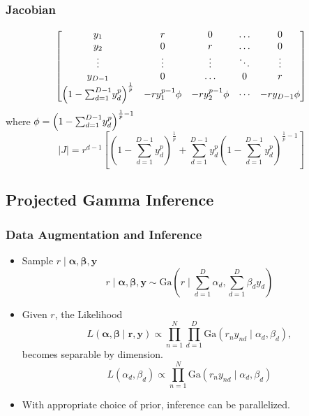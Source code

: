 \documentclass[aspectratio=169,10pt,notes]{beamer}
\begin{document}
\begin{frame}
  \frametitle{Jacobian}
  \label{pgpareto:jacobian}
  \begin{equation*}
    \begin{bmatrix}
      y_1 & r & 0 & \ldots & 0\\
      y_2 & 0 & r & \ldots & 0\\
      \vdots & \vdots & \vdots & \ddots & \vdots\\
      y_{D-1} & 0 & \ldots & 0 & r \\
      \left(1 - {\scriptsize\sum_{d=1}^{D-1}}y_d^p\right)^{\frac{1}{p}} &
        - ry_1^{p-1}\phi & -ry_2^{p-1}\phi & \cdots & -ry_{D-1}\phi
    \end{bmatrix}
  \end{equation*}
  where $\phi = \left(1 - {\scriptsize\sum_{d=1}^{D-1}}y_d^p\right)^{\frac{1}{p} - 1}$
  \begin{equation*}
  \lvert J \rvert = r^{d-1}\left[\left(1 - {\textstyle\sum}_{d = 1}^{D-1}y_d^p\right)^{\frac{1}{p}} +
      {\textstyle\sum}_{d = 1}^{D-1}y_d^p\left(1 - {\textstyle\sum}_{d=1}^{D-1}
          y_d^p\right)^{\frac{1}{p} - 1}\right]
  \end{equation*}
\end{frame} %

\subsection*{Projected Gamma Inference}

\begin{frame}
    \frametitle{Data Augmentation and Inference}
    \label{pgpareto:projgammainference}
    {\small 
    \begin{itemize}
        \item Sample $r\mid\bm{\alpha},\bm{\beta},\bm{y}$
        \[
            r\mid\bm{\alpha},\bm{\beta},\bm{y} \sim 
                \text{Ga}\left(r\mid \sum_{d = 1}^D \alpha_d, 
                    \sum_{d = 1}^D\beta_dy_d\right)
        \]
        \item Given $r$, the Likelihood
        \[
        L(\bm{\alpha},\bm{\beta}\mid \bm{r},\bm{y}) 
            \propto \prod_{n = 1}^N\prod_{d = 1}^D
            \text{Ga}\left(r_ny_{nd}\mid\alpha_d,\beta_d\right),
        \]
        becomes separable by dimension.
        \[
        L(\alpha_d,\beta_d) \propto 
            \prod_{n = 1}^N\text{Ga}\left(r_ny_{nd}\mid\alpha_d,\beta_d\right)
        \]
        \item With appropriate choice of prior, inference can be parallelized.
    \end{itemize}
    }
    \hyperlink{pgpareto:projectedgamma}{}
\end{frame} %
\end{document}
